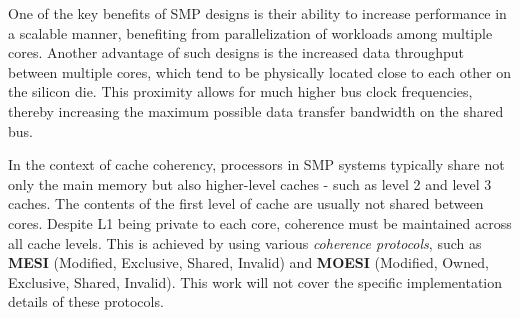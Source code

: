 One of the key benefits of SMP designs is their ability to increase performance in a scalable manner, benefiting from parallelization of workloads among multiple cores. %
Another advantage of such designs is the increased data throughput between multiple cores, which tend to be physically located close to each other on the silicon die.
This proximity allows for much higher bus clock frequencies, thereby increasing the maximum possible data transfer bandwidth on the shared bus. %

In the context of cache coherency, processors in SMP systems typically share not only the main memory but also higher-level caches - such as level 2 and level 3 caches.
The contents of the first level of cache are usually not shared between cores. Despite L1 being private to each core, coherence must be maintained across all cache levels. %
This is achieved by using various \textit{coherence protocols}, such as \textbf{MESI} (Modified, Exclusive, Shared, Invalid) and \textbf{MOESI} (Modified, Owned, Exclusive, Shared, Invalid).
This work will not cover the specific implementation details of these protocols. %

